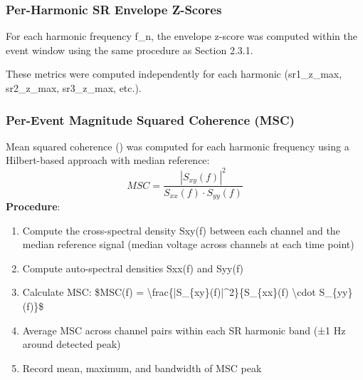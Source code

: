 \documentclass[11pt,a4paper]{article}
\begin{document}
\subsubsection{Per-Harmonic SR Envelope Z-Scores}
For each harmonic frequency f\_n, the envelope z-score was computed within the event window using the same procedure as Section 2.3.1.

\begin{table}[H]
    \centering
\end{table}

These metrics were computed independently for each harmonic (sr1\_z\_max, sr2\_z\_max, sr3\_z\_max, etc.).

\subsubsection{Per-Event Magnitude Squared Coherence (MSC)}
Mean squared coherence (\cite{carter1973estimation}) was computed for each harmonic frequency using a Hilbert-based approach with median reference:
\begin{displaymath}
MSC = \frac{|S_{xy}(f)|^2}{S_{xx}(f) \cdot S_{yy}(f)}
\end{displaymath}
\textbf{Procedure}:
\begin{enumerate}
\item Compute the cross-spectral density Sxy(f) between each channel and the median reference signal (median voltage across channels at each time point)
\item Compute auto-spectral densities Sxx(f) and Syy(f)
\item Calculate MSC:  \$MSC(f) = \textbackslash{}frac\{|S\_\{xy\}(f)|\textasciicircum{}2\}\{S\_\{xx\}(f) \textbackslash{}cdot S\_\{yy\}(f)\}\$
\item Average MSC across channel pairs within each SR harmonic band (±1 Hz around detected peak)
\item Record mean, maximum, and bandwidth of MSC peak
\end{enumerate}
\end{document}
